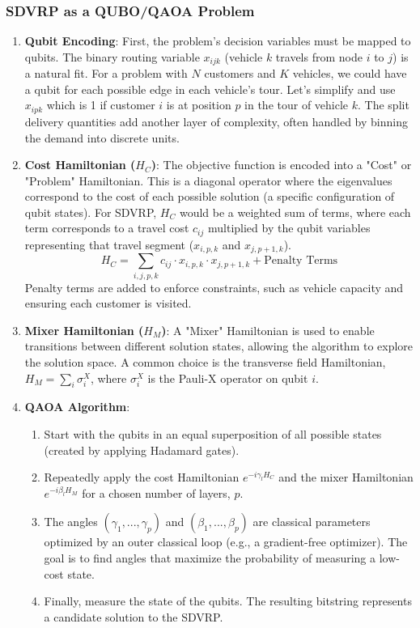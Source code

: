 \documentclass{article}
\begin{document}
\subsubsection{SDVRP as a QUBO/QAOA Problem}
\begin{enumerate}
    \item \textbf{Qubit Encoding}: First, the problem's decision variables must be mapped to qubits. The binary routing variable $x_{ijk}$ (vehicle $k$ travels from node $i$ to $j$) is a natural fit. For a problem with $N$ customers and $K$ vehicles, we could have a qubit for each possible edge in each vehicle's tour. Let's simplify and use $x_{ipk}$ which is 1 if customer $i$ is at position $p$ in the tour of vehicle $k$. The split delivery quantities add another layer of complexity, often handled by binning the demand into discrete units.

    \item \textbf{Cost Hamiltonian ($H_C$)}: The objective function is encoded into a "Cost" or "Problem" Hamiltonian. This is a diagonal operator where the eigenvalues correspond to the cost of each possible solution (a specific configuration of qubit states). For SDVRP, $H_C$ would be a weighted sum of terms, where each term corresponds to a travel cost $c_{ij}$ multiplied by the qubit variables representing that travel segment ($x_{i,p,k}$ and $x_{j,p+1,k}$).
    \begin{equation}
    H_C = \sum_{i,j,p,k} c_{ij} \cdot x_{i,p,k} \cdot x_{j,p+1,k} + \text{Penalty Terms}
    \end{equation}
    Penalty terms are added to enforce constraints, such as vehicle capacity and ensuring each customer is visited.

    \item \textbf{Mixer Hamiltonian ($H_M$)}: A "Mixer" Hamiltonian is used to enable transitions between different solution states, allowing the algorithm to explore the solution space. A common choice is the transverse field Hamiltonian, $H_M = \sum_i \sigma_i^X$, where $\sigma_i^X$ is the Pauli-X operator on qubit $i$.

    \item \textbf{QAOA Algorithm}:
    \begin{enumerate}
        \item Start with the qubits in an equal superposition of all possible states (created by applying Hadamard gates).
        \item Repeatedly apply the cost Hamiltonian $e^{-i\gamma_l H_C}$ and the mixer Hamiltonian $e^{-i\beta_l H_M}$ for a chosen number of layers, $p$.
        \item The angles $(\gamma_1, ..., \gamma_p)$ and $(\beta_1, ..., \beta_p)$ are classical parameters optimized by an outer classical loop (e.g., a gradient-free optimizer). The goal is to find angles that maximize the probability of measuring a low-cost state.
        \item Finally, measure the state of the qubits. The resulting bitstring represents a candidate solution to the SDVRP.
    \end{enumerate}
\end{enumerate}
\end{document}
